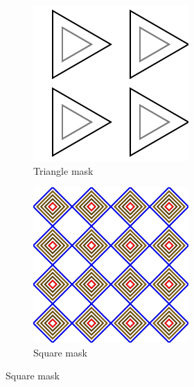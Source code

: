 \documentclass[a4paper, oneside]{discothesis}
\begin{document}
\begin{figure}[th]
	\begin{subfigure}[t]{0.19\textwidth}\centering\includegraphics[width=\linewidth]{figures/3_2_2_False.png}\caption{Triangle mask}\label{fig:atk1}\end{subfigure}
	\hfill
	\begin{subfigure}[t]{0.19\textwidth}\centering\includegraphics[width=\linewidth]{figures/4_4_5_True.png}\caption{Square mask}\label{fig:atk2}\end{subfigure}

\end{figure}
\end{document}
